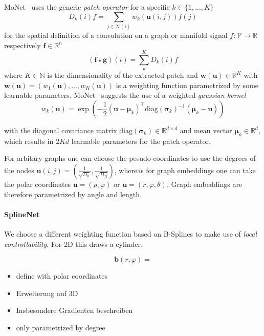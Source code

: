 \documentclass[pdftex,10pt,a4paper]{scrartcl}
\begin{document}
MoNet~\cite{Monti2016} uses the generic \emph{patch operator} for a specific $k \in \{ 1, \ldots, K \}$
\begin{equation*}
  D_k(i)f = \sum_{j \in \mathcal{N}(i)} w_k(\mathbf{u}(i, j)) f(j)
\end{equation*}
for the spatial definition of a convolution on a graph or manifold signal $f \colon \mathcal{V} \to \mathbb{R}$ respectively $\mathbf{f} \in \mathbb{R}^n$
\begin{equation*}
  (\mathbf{f} \star \mathbf{g})(i) = \sum_k^K D_k(i)f
\end{equation*}
where $K \in \mathbb{N}$ is the dimensionality of the extracted patch and $\mathbf{w}(\mathbf{u}) \in \mathbb{R}^K$ with $\mathbf{w}(\mathbf{u}) = (w_1(\mathbf{u}), \ldots, w_K(\mathbf{u}))$ is a weighting function parametrized by some learnable parameters.
MoNet~\cite{Monti2016} suggests the use of a weighted \emph{gaussian kernel}
\begin{equation*}
  w_k(\mathbf{u}) = \exp \left(-\frac{1}{2} {(\mathbf{u} - \mathbf{\mu}_k)}^{\top} {\mathrm{diag}(\mathbf{\sigma}_k)}^{-1} (\mathbf{\mu}_k - \mathbf{u}) \right)
\end{equation*}

with the diagonal covariance matrix $\mathrm{diag}(\mathbf{\sigma}_k) \in \mathbb{R}^{d \times d}$ and mean vector $\mathbf{\mu}_k \in \mathbb{R}^d$, which results in $2Kd$ learnable parameters for the patch operator.

For arbitary graphs one can choose the pesudo-coordinates to use the degrees of the nodes $\mathbf{u}(i,j) = \left( \tfrac{1}{\sqrt{D_{ii}}}, \tfrac{1}{\sqrt{D_{jj}}} \right)$, whereas for graph embeddings one can take the polar coordinates $\mathbf{u} = (\rho, \varphi)$ or $\mathbf{u} = (r, \varphi, \theta)$.
Graph embeddings are therefore parametrized by angle and length.

\paragraph{SplineNet}

We choose a different weighting function based on B-Splines to make use of \emph{local controllability}.
For 2D this draws a cylinder.

\begin{equation*}
  \mathbf{b}(r, \varphi) =
\end{equation*}





\begin{itemize}
  \item define with polar coordinates
  \item Erweiterung auf 3D
  \item Insbesondere Gradienten beschreiben
\end{itemize}

\begin{itemize}
  \item only parametrized by degree
\end{itemize}



\end{document}
